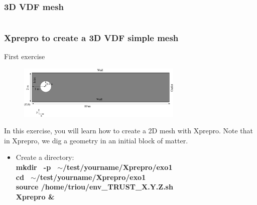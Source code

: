 \documentclass[10pt]{beamer}
\begin{document}
\subsubsection{3D VDF mesh}
\begin{frame}
\begin{columns}[c] 
\tableofcontents[sections={1-7},currentsection, currentsubsection]
\tableofcontents[sections={8-13},currentsection, currentsubsection]
\end{columns}
\end{frame}
\begin{frame}
\frametitle{Xprepro to create a 3D VDF simple mesh}
\begin{block}{First exercise}

\begin{figure}
\includegraphics[width=0.7\textwidth]{PICTURES/xprepro0.pdf}
\end{figure}

In this exercise, you will learn how to create a 2D mesh with Xprepro. 
Note that in Xprepro, we dig a geometry in an initial block of matter.
\vspace{0.2cm}

\begin{itemize}
\item Create a directory:\\
\textbf{mkdir \, -p \, $\sim$/test/yourname/Xprepro/exo1} \\
\textbf{cd \, $\sim$/test/yourname/Xprepro/exo1} \\
\textbf{source /home/triou/env\_TRUST\_X.Y.Z.sh }\\
\textbf{Xprepro \&} 
\end{itemize}

\end{block}
\end{frame}
\end{document}
